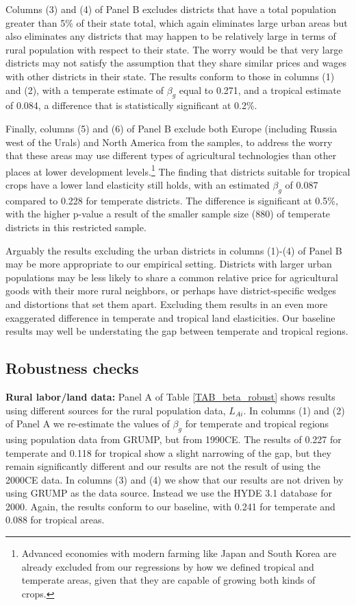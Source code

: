 \documentclass[11pt]{article}
\begin{document}
Columns (3) and (4) of Panel B excludes districts that have a total population greater than 5\% of their state total, which again eliminates large urban areas but also eliminates any districts that may happen to be relatively large in terms of rural population with respect to their state. The worry would be that very large districts may not satisfy the assumption that they share similar prices and wages with other districts in their state. The results conform to those in columns (1) and (2), with a temperate estimate of $\beta_g$ equal to 0.271, and a tropical estimate of 0.084, a difference that is statistically significant at 0.2\%. 

Finally, columns (5) and (6) of Panel B exclude both Europe (including Russia west of the Urals) and North America from the samples, to address the worry that these areas may use different types of agricultural technologies than other places at lower development levels.\footnote{Advanced economies with modern farming like Japan and South Korea are already excluded from our regressions by how we defined tropical and temperate areas, given that they are capable of growing both kinds of crops.} The finding that districts suitable for tropical crops have a lower land elasticity still holds, with an estimated $\beta_g$ of 0.087 compared to 0.228 for temperate districts. The difference is significant at 0.5\%, with the higher p-value a result of the smaller sample size (880) of temperate districts in this restricted sample.

Arguably the results excluding the urban districts in columns (1)-(4) of Panel B may be more appropriate to our empirical setting. Districts with larger urban populations may be less likely to share a common relative price for agricultural goods with their more rural neighbors, or perhaps have district-specific wedges and distortions that set them apart. Excluding them results in an even more exaggerated difference in temperate and tropical land elasticities. Our baseline results may well be understating the gap between temperate and tropical regions.

\subsection{Robustness checks}
\noindent\textbf{Rural labor/land data:} Panel A of Table \ref{TAB_beta_robust} shows results using different sources for the rural population data, $L_{Ai}$. In columns (1) and (2) of Panel A we re-estimate the values of $\beta_g$ for temperate and tropical regions using population data from GRUMP, but from 1990CE. The results of 0.227 for temperate and 0.118 for tropical show a slight narrowing of the gap, but they remain significantly different and our results are not the result of using the 2000CE data. In columns (3) and (4) we show that our results are not driven by using GRUMP as the data source. Instead we use the HYDE 3.1 database \citep{hyde31} for 2000. Again, the results conform to our baseline, with 0.241 for temperate and 0.088 for tropical areas. 
\end{document}
